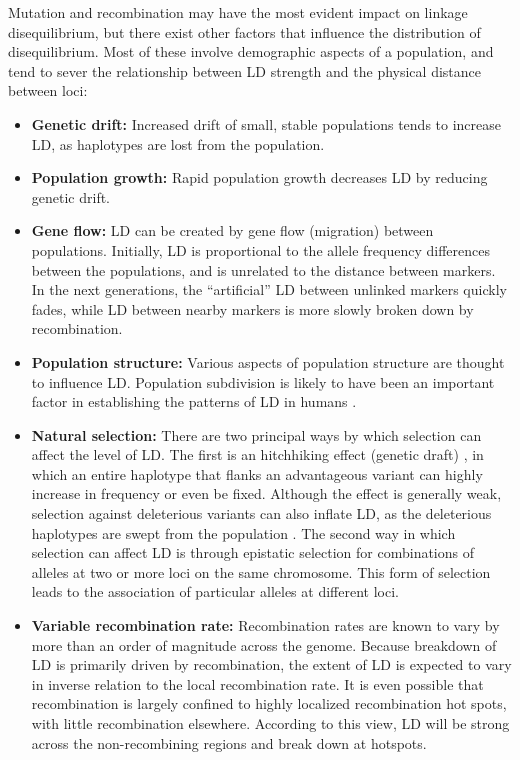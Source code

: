 \documentclass[]{book}
\begin{document}
Mutation and recombination may have the most evident impact on linkage
disequilibrium, but there exist other factors that influence the
distribution of disequilibrium. Most of these involve demographic
aspects of a population, and tend to sever the relationship between LD
strength and the physical distance between loci:

\begin{itemize}
\item
  \textbf{Genetic drift:} Increased drift of small, stable populations
  tends to increase LD, as haplotypes are lost from the population.
\item
  \textbf{Population growth:} Rapid population growth decreases LD by
  reducing genetic drift.
\item
  \textbf{Gene flow:} LD can be created by gene flow (migration) between
  populations. Initially, LD is proportional to the allele frequency
  differences between the populations, and is unrelated to the
  distance between markers. In the next generations, the ``artificial''
  LD between unlinked markers quickly fades, while LD between nearby
  markers is more slowly broken down by recombination.
\item
  \textbf{Population structure:} Various aspects of population structure
  are thought to influence LD. Population subdivision is likely to
  have been an important factor in establishing the patterns of LD in
  humans \citep{gabriel_structure_2002}.
\item
  \textbf{Natural selection:} There are two principal ways by which
  selection can affect the level of LD. The first is an hitchhiking
  effect (genetic draft) \citep{smith1974hitch}, in which an entire
  haplotype that flanks an advantageous variant can highly increase in
  frequency or even be fixed. Although the effect is generally weak,
  selection against deleterious variants can also inflate LD, as the
  deleterious haplotypes are swept from the population
  \citep{charlesworth1993effect}. The second way in which selection can
  affect LD is through epistatic selection for combinations of alleles
  at two or more loci on the same chromosome. This form of selection
  leads to the association of particular alleles at different loci.
\item
  \textbf{Variable recombination rate:} Recombination rates are known to
  vary by more than an order of magnitude across the genome. Because
  breakdown of LD is primarily driven by recombination, the extent of
  LD is expected to vary in inverse relation to the local
  recombination rate. It is even possible that recombination is
  largely confined to highly localized recombination hot spots, with
  little recombination elsewhere. According to this view, LD will be
  strong across the non-recombining regions and break down at
  hotspots.
\end{itemize}
\end{document}
